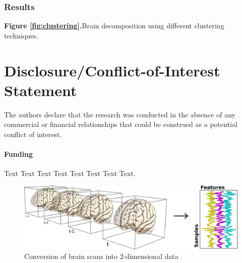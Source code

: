 \documentclass{frontiersSCNS} %
\begin{document}
\subsubsection{Results}

\textbf{Figure \ref{fig:clustering}.}{Brain decomposition using different clustering techniques.}\label{fig:04}


\section*{Disclosure/Conflict-of-Interest Statement}
The authors declare that the research was conducted in the absence of any
commercial or financial relationships that could be construed as a potential
conflict of interest.

\paragraph{Funding\textcolon} Text Text Text Text Text Text  Text Text.



\newpage

\begin{figure}[h]
    \includegraphics[width=.5\linewidth]{img/niimgs.jpg}
    \caption{Conversion of brain scans into 2-dimensional data}
    \label{fig:niimg}
\end{figure}
\end{document}
